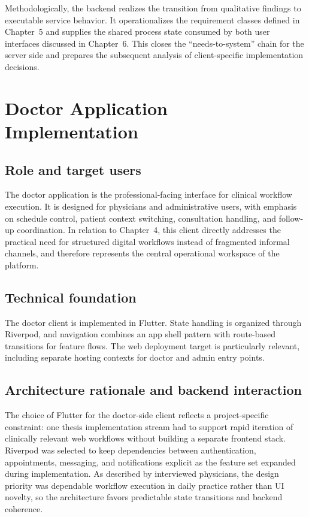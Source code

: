 \documentclass[11pt,a4paper,twoside,openany,headings=normal]{scrreprt}
\begin{document}
Methodologically, the backend realizes the transition from qualitative findings to executable service behavior. It operationalizes the requirement classes defined in Chapter~5 and supplies the shared process state consumed by both user interfaces discussed in Chapter~6. This closes the ``needs-to-system'' chain for the server side and prepares the subsequent analysis of client-specific implementation decisions.

\chapter{Doctor Application Implementation}
\label{ch:doctor-implementation}

\section{Role and target users}

The doctor application is the professional-facing interface for clinical workflow execution. It is designed for physicians and administrative users, with emphasis on schedule control, patient context switching, consultation handling, and follow-up coordination. In relation to Chapter~4, this client directly addresses the practical need for structured digital workflows instead of fragmented informal channels, and therefore represents the central operational workspace of the platform.

\section{Technical foundation}

The doctor client is implemented in Flutter. State handling is organized through Riverpod, and navigation combines an app shell pattern with route-based transitions for feature flows. The web deployment target is particularly relevant, including separate hosting contexts for doctor and admin entry points.

\ShifaFigDoctorShell

\section{Architecture rationale and backend interaction}

The choice of Flutter for the doctor-side client reflects a project-specific constraint: one thesis implementation stream had to support rapid iteration of clinically relevant web workflows without building a separate frontend stack. Riverpod was selected to keep dependencies between authentication, appointments, messaging, and notifications explicit as the feature set expanded during implementation. As described by interviewed physicians, the design priority was dependable workflow execution in daily practice rather than UI novelty, so the architecture favors predictable state transitions and backend coherence.
\end{document}
